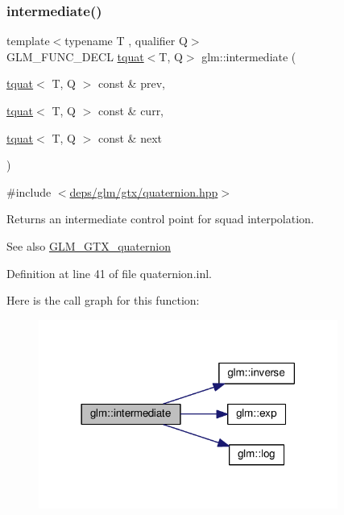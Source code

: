 \subsubsection{\texorpdfstring{intermediate()}{intermediate()}}
{\footnotesize\ttfamily template$<$typename T , qualifier Q$>$ \\
G\+L\+M\+\_\+\+F\+U\+N\+C\+\_\+\+D\+E\+CL \hyperlink{structglm_1_1tquat}{tquat}$<$T, Q$>$ glm\+::intermediate (\begin{DoxyParamCaption}\item[{\hyperlink{structglm_1_1tquat}{tquat}$<$ T, Q $>$ const \&}]{prev,  }\item[{\hyperlink{structglm_1_1tquat}{tquat}$<$ T, Q $>$ const \&}]{curr,  }\item[{\hyperlink{structglm_1_1tquat}{tquat}$<$ T, Q $>$ const \&}]{next }\end{DoxyParamCaption})}



{\ttfamily \#include $<$\hyperlink{gtx_2quaternion_8hpp}{deps/glm/gtx/quaternion.\+hpp}$>$}

Returns an intermediate control point for squad interpolation.

\begin{DoxySeeAlso}{See also}
\hyperlink{group__gtx__quaternion}{G\+L\+M\+\_\+\+G\+T\+X\+\_\+quaternion} 
\end{DoxySeeAlso}


Definition at line 41 of file quaternion.\+inl.

Here is the call graph for this function\+:
\nopagebreak
\begin{figure}[H]
\begin{center}
\leavevmode
\includegraphics[width=278pt]{d8/db2/group__gtx__quaternion_gac9be2084562a52ae8923813233563a28_cgraph}
\end{center}
\end{figure}
\mbox{\label{group__gtx__quaternion_ga229bacc3051770b030042fe266f7b0cb}} 

